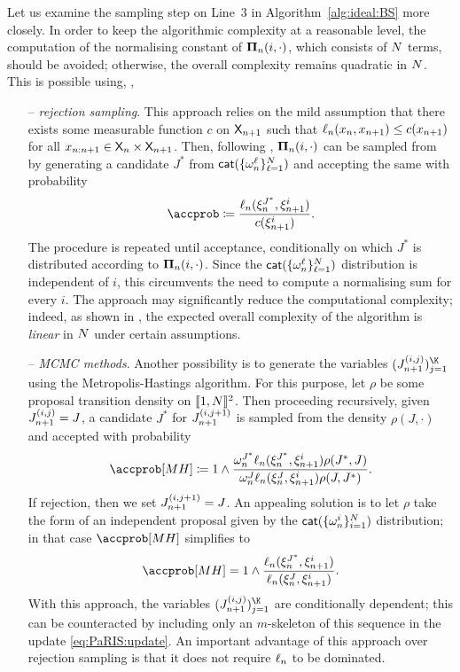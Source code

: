 Let us examine the sampling step on Line~3 in Algorithm~\ref{alg:ideal:BS} more closely. 
In order to keep the algorithmic complexity at a reasonable level, the computation of the normalising constant of $\boldsymbol{\Pi}_{n}(i, \cdot)$, which consists of $N$ terms, should be avoided; otherwise, the overall complexity remains quadratic in $N$. This is possible using, \eg,   
\begin{itemize}
\item[--] \emph{rejection sampling}. This approach relies on the mild assumption that there exists some measurable function $c$ on $\mathsf{X}_{n + 1}$ such that $\ell_{n}(x_n, x_{n + 1}) \leq c(x_{n + 1})$ for all $x_{n: n + 1} \in \mathsf{X}_n \times \mathsf{X}_{n + 1}$. Then, following \cite{douc:garivier:moulines:olsson:2010}, $\boldsymbol{\Pi}_{n}(i, \cdot)$ can be sampled from by generating a candidate $J^\ast$ from $\mathsf{cat}(\{ \omega_{n}^{\ell}\}_{\ell = 1}^N)$ and accepting the same with probability 
\begin{equation} \label{eq:std:acc:prob:backward:sampling}
\accprob \eqdef \frac{\ud{n}(\epart{n}{J^\ast}, \epart{n + 1}{i})}{c(\epart{n + 1}{i})}. 
\end{equation}
The procedure is repeated until acceptance, conditionally on which $J^\ast$ is distributed according to $\boldsymbol{\Pi}_{n}(i, \cdot)$. Since the $\mathsf{cat}(\{ \omega_{n}^{\ell}\}_{\ell = 1}^N)$ distribution is independent of $i$, this circumvents the need to compute a normalising sum for every $i$. The approach may significantly reduce the computational complexity; indeed, as shown in \cite[Proposition~2]{douc:garivier:moulines:olsson:2010}, the expected overall complexity of the algorithm is \emph{linear} in $N$ under certain assumptions.   
\item[--] \emph{MCMC methods}. Another possibility is to generate the variables $(\bi{n + 1}{i}{j})_{j = 1}^{\K}$ using the Metropolis-Hastings algorithm. For this purpose, let $\rho$ be some proposal transition density on $\llbracket 1, N \rrbracket^2$. Then proceeding recursively, given $J_{n + 1}^{(i, j)} = J$, a candidate $J^\ast$ for $J_{n + 1}^{(i, j + 1)}$ is sampled from the density $\rho(J, \cdot)$ and accepted with probability 
$$
\accprob[MH] \eqdef 1 \wedge\frac{\ewght{n}{J^\ast} \ud{n}(\epart{n}{J^\ast}, \epart{n + 1}{i}) \rho(J^\ast, J)}{\ewght{n}{J} \ud{n}(\epart{n}{J}, \epart{n + 1}{i}) \rho(J, J^\ast)}. 
$$ 
If rejection, then we set $J_{n + 1}^{(i, j + 1)} = J$. An appealing solution is to let $\rho$ take the form of an independent proposal given by the $\mathsf{cat}(\{ \omega_{n}^{i} \}_{i = 1}^N)$ distribution; in that case $\accprob[MH]$ simplifies to  
\begin{equation} \label{eq:std:MH:prob:backward:sampling}
\accprob[MH] = 1 \wedge \frac{\ud{n}(\epart{n}{J^\ast}, \epart{n + 1}{i})}{\ud{n}(\epart{n}{J}, \epart{n + 1}{i})}. 
\end{equation}
With this approach, the variables $(\bi{n + 1}{i}{j})_{j = 1}^{\K}$ are conditionally dependent; this can be counteracted by including only an $m$-skeleton of this sequence in the update \eqref{eq:PaRIS:update}. An important advantage of this approach over rejection sampling is that it does not require $\ell_{n}$ to be dominated.  
\end{itemize}

